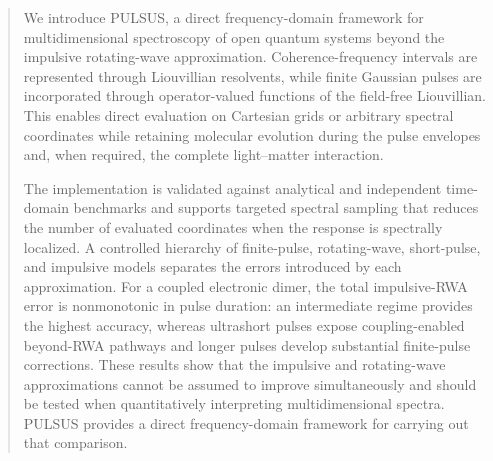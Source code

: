 \begin{abstract}
We introduce PULSUS, a direct frequency-domain framework for
multidimensional spectroscopy of open quantum systems beyond the
impulsive rotating-wave approximation. Coherence-frequency intervals
are represented through Liouvillian resolvents, while finite Gaussian
pulses are incorporated through operator-valued functions of the
field-free Liouvillian. This enables direct evaluation on Cartesian
grids or arbitrary spectral coordinates while retaining molecular
evolution during the pulse envelopes and, when required, the complete
light--matter interaction.

The implementation is validated against analytical and independent
time-domain benchmarks and supports targeted spectral sampling that
reduces the number of evaluated coordinates when the response is
spectrally localized. A controlled hierarchy of finite-pulse,
rotating-wave, short-pulse, and impulsive models separates the errors
introduced by each approximation. For a coupled electronic dimer, the
total impulsive-RWA error is nonmonotonic in pulse duration: an
intermediate regime provides the highest accuracy, whereas ultrashort
pulses expose coupling-enabled beyond-RWA pathways and longer pulses
develop substantial finite-pulse corrections. These results show that
the impulsive and rotating-wave approximations cannot be assumed to
improve simultaneously and should be tested when quantitatively
interpreting multidimensional spectra. PULSUS provides a direct
frequency-domain framework for carrying out that comparison.
\end{abstract}